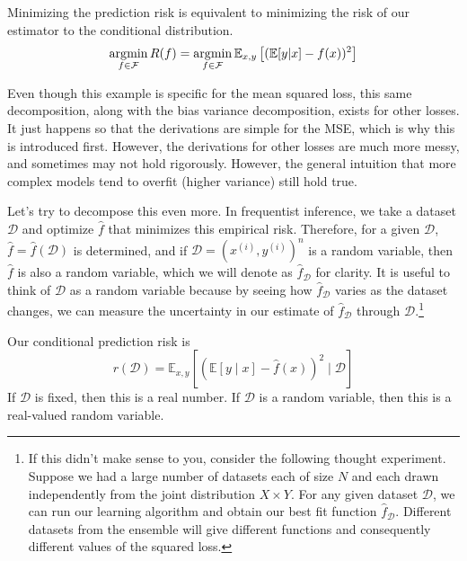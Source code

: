   \begin{corollary}
    Minimizing the prediction risk is equivalent to minimizing the risk of our estimator to the conditional distribution. 
    \begin{equation}
      \operatorname*{\arg\!\min}_{f \in \mathcal{F}} R(f) = \operatorname*{\arg\!\min}_{f \in \mathcal{F}} \mathbb{E}_{x, y} \left[ (\mathbb{E}[y|x] - f(x))^2 \right]
    \end{equation}
  \end{corollary}
  
  Even though this example is specific for the mean squared loss, this same decomposition, along with the bias variance decomposition, exists for other losses. It just happens so that the derivations are simple for the MSE, which is why this is introduced first. However, the derivations for other losses are much more messy, and sometimes may not hold rigorously. However, the general intuition that more complex models tend to overfit (higher variance) still hold true. 

  Let's try to decompose this even more. In frequentist inference, we take a dataset $\mathcal{D}$ and optimize $\hat{f}$ that minimizes this empirical risk. Therefore, for a given $\mathcal{D}$, $\hat{f} = \hat{f}(\mathcal{D})$ is determined, and if $\mathcal{D} = (x^{(i)}, y^{(i)})^n$ is a random variable, then $\hat{f}$ is also a random variable, which we will denote as $\hat{f}_{\mathcal{D}}$ for clarity. It is useful to think of $\mathcal{D}$ as a random variable because by seeing how $\hat{f}_{\mathcal{D}}$ varies as the dataset changes, we can measure the uncertainty in our estimate of $\hat{f}_{\mathcal{D}}$ through $\mathcal{D}$.\footnote{If this didn't make sense to you, consider the following thought experiment. Suppose we had a large number of datasets each of size $N$ and each drawn independently from the joint distribution $X \times Y$. For any given dataset $\mathcal{D}$, we can run our learning algorithm and obtain our best fit function $\hat{f}_{\mathcal{D}}$. Different datasets from the ensemble will give different functions and consequently different values of the squared loss. }

  \begin{lemma} 
    Our conditional prediction risk is 
    \begin{equation}
      r(\mathcal{D}) = \mathbb{E}_{x, y} \left[ (\mathbb{E}[y \mid x] - \hat{f}(x))^2 \mid \mathcal{D} \right]
    \end{equation}
    If $\mathcal{D}$ is fixed, then this is a real number. If $\mathcal{D}$ is a random variable, then this is a real-valued random variable. 
  \end{lemma} 

